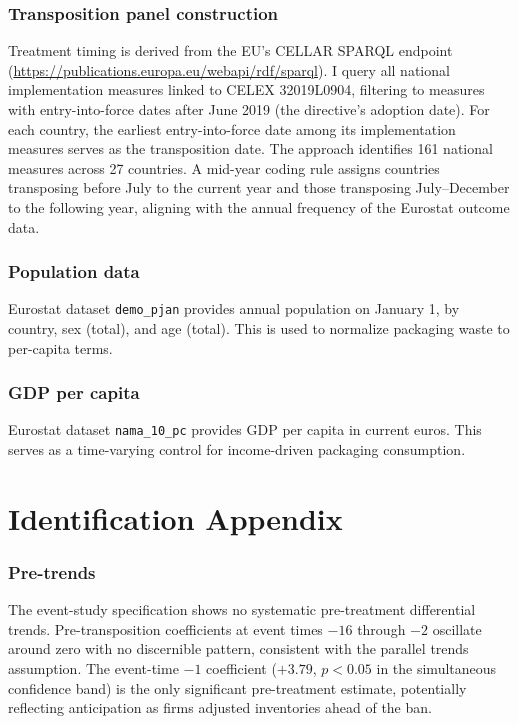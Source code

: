 \documentclass[12pt]{article}
\begin{document}
\subsubsection*{Transposition panel construction} Treatment timing is derived from the EU's CELLAR SPARQL endpoint (\url{https://publications.europa.eu/webapi/rdf/sparql}). I query all national implementation measures linked to CELEX 32019L0904, filtering to measures with entry-into-force dates after June 2019 (the directive's adoption date). For each country, the earliest entry-into-force date among its implementation measures serves as the transposition date. The approach identifies 161 national measures across 27 countries. A mid-year coding rule assigns countries transposing before July to the current year and those transposing July--December to the following year, aligning with the annual frequency of the Eurostat outcome data.

\subsubsection*{Population data} Eurostat dataset \texttt{demo\_pjan} provides annual population on January 1, by country, sex (total), and age (total). This is used to normalize packaging waste to per-capita terms.

\subsubsection*{GDP per capita} Eurostat dataset \texttt{nama\_10\_pc} provides GDP per capita in current euros. This serves as a time-varying control for income-driven packaging consumption.


\section{Identification Appendix}
\label{app:identification}

\subsubsection*{Pre-trends} The event-study specification shows no systematic pre-treatment differential trends. Pre-transposition coefficients at event times $-16$ through $-2$ oscillate around zero with no discernible pattern, consistent with the parallel trends assumption. The event-time $-1$ coefficient ($+3.79$, $p < 0.05$ in the simultaneous confidence band) is the only significant pre-treatment estimate, potentially reflecting anticipation as firms adjusted inventories ahead of the ban.
\end{document}
